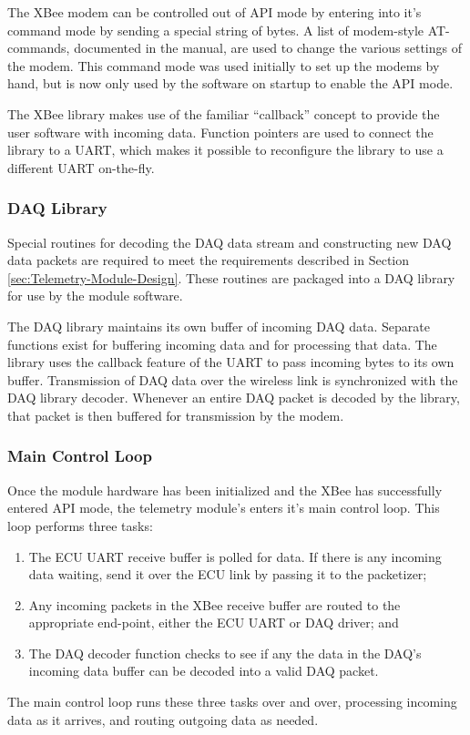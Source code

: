 The XBee modem can be controlled out of API mode by entering into it's command mode by sending a special string of bytes. A list of modem-style AT-commands, documented in the manual, are used to change the various settings of the modem. This command mode was used initially to set up the modems by hand, but is now only used by the software on startup to enable the API mode.

The XBee library makes use of the familiar ``callback'' concept to provide the user software with incoming data. Function pointers are used to connect the library to a UART, which makes it possible to reconfigure the library to use a different UART on-the-fly.

\subsubsection{DAQ Library}
\label{sec:dac_library}

Special routines for decoding the DAQ data stream and constructing new DAQ data packets are required to meet the requirements described in Section \ref{sec:Telemetry-Module-Design}. These routines are packaged into a DAQ library for use by the module software.

The DAQ library maintains its own buffer of incoming DAQ data. Separate functions exist for buffering incoming data and for processing that data. The library uses the callback feature of the UART to pass incoming bytes to its own buffer. Transmission of DAQ data over the wireless link is synchronized with the DAQ library decoder. Whenever an entire DAQ packet is decoded by the library, that packet is then buffered for transmission by the modem.

\subsubsection{Main Control Loop}

Once the module hardware has been initialized and the XBee has successfully entered API mode, the telemetry module's enters it's main control loop. This loop performs three tasks:

\begin{enumerate}
  \item The ECU UART receive buffer is polled for data. If there is any incoming data waiting, send it over the ECU link by passing it to the packetizer;
  \item Any incoming packets in the XBee receive buffer are routed to the appropriate end-point, either the ECU UART or DAQ driver; and
  \item The DAQ decoder function checks to see if any the data in the DAQ's incoming data buffer can be decoded into a valid DAQ packet.
\end{enumerate}

The main control loop runs these three tasks over and over, processing incoming data as it arrives, and routing outgoing data as needed. 
